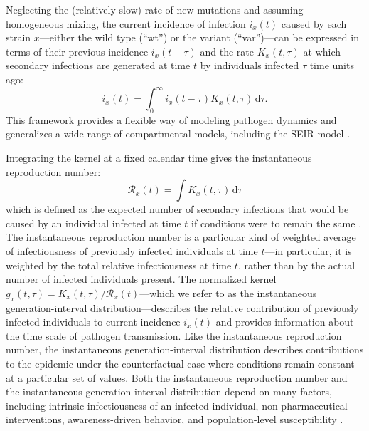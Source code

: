 \documentclass[12pt]{article}
\newcommand{\RR}{\ensuremath{{\mathcal R}}\xspace}
\newcommand{\dd}[1]{\ensuremath{\, \mathrm{d}#1}}
\newcommand{\dtau}{\dd{\tau}}
\begin{document}
Neglecting the (relatively slow) rate of new mutations and assuming homogeneous mixing, the current incidence of infection $i_x(t)$ caused by each strain $x$---either the wild type (``wt'') or the variant (``var'')---can be expressed in terms of their previous incidence $i_x(t-\tau)$ and the rate $K_x(t, \tau)$ at which secondary infections are generated at time $t$ by individuals infected $\tau$ time units ago:
\begin{equation}
i_x(t) = \int_0^\infty i_x(t-\tau) K_x(t, \tau) \dtau.
\end{equation}
This framework provides a flexible way of modeling pathogen dynamics and generalizes a wide range of compartmental models, including the SEIR model \citep{heesterbeek1996concept, diekmann2000mathematical, roberts2004modelling, aldis2005integral,breda2012formulation, champredon2018equivalence}.

Integrating the kernel at a fixed calendar time gives the instantaneous reproduction number:
\begin{equation}
\RR_x(t) = \int K_x(t, \tau) \dtau
\label{eq:instR}
\end{equation}
which is defined as the expected number of secondary infections that would be caused by an individual infected at time $t$ if conditions were to remain the same \citep{fraser2007estimating}.
The instantaneous reproduction number is a particular kind of weighted average of infectiousness of previously infected individuals at time $t$---in particular, it is weighted by the total relative infectiousness at time $t$, rather than by the actual number of infected individuals present.
The normalized kernel $g_x(t, \tau) = K_x(t, \tau)/\RR_x(t)$---which we refer to as the instantaneous generation-interval distribution---describes the relative contribution of previously infected individuals to current incidence $i_x(t)$ and provides information about the time scale of pathogen transmission.
Like the instantaneous reproduction number, the instantaneous generation-interval distribution describes contributions to the epidemic under the counterfactual case where conditions remain constant at a particular set of values. 
Both the instantaneous reproduction number and the instantaneous generation-interval distribution depend on many factors, including intrinsic infectiousness of an infected individual, non-pharmaceutical interventions, awareness-driven behavior, and population-level susceptibility \citep{fraser2007estimating}.
\end{document}
